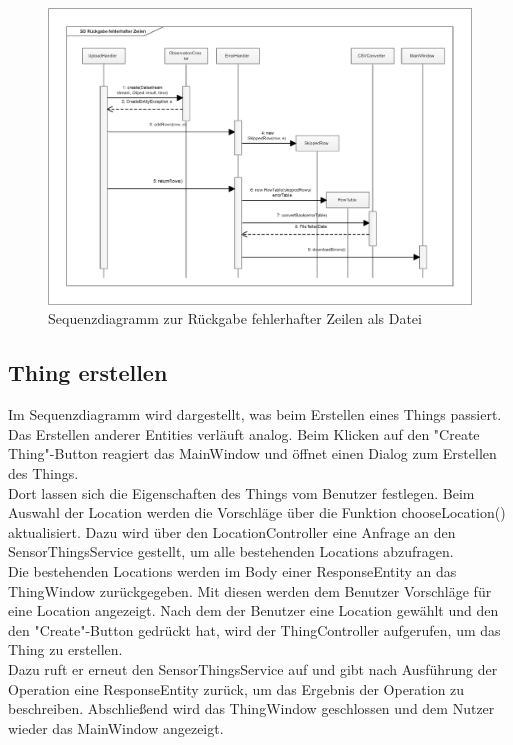 \vspace{\fill}
\begin{figure}[htbp]
\centering
\includegraphics[scale=0.5]{uml/eps/SD_returnErrors.eps}
\caption{Sequenzdiagramm zur Rückgabe fehlerhafter Zeilen als Datei}
\end{figure}
\vspace{\fill}

\clearpage
\subsection{Thing erstellen}

Im Sequenzdiagramm wird dargestellt, was beim Erstellen eines Things passiert.
Das Erstellen anderer Entities verläuft analog.
Beim Klicken auf den "{Create Thing}"{-Button} reagiert das MainWindow und öffnet einen Dialog zum Erstellen des Things.\\
Dort lassen sich die Eigenschaften des Things vom Benutzer festlegen.
Beim Auswahl der Location werden die Vorschläge über die Funktion chooseLocation() aktualisiert.
Dazu wird über den LocationController eine Anfrage an den SensorThingsService gestellt, um alle bestehenden Locations abzufragen.\\
Die bestehenden Locations werden im Body einer ResponseEntity an das ThingWindow zurückgegeben.
Mit diesen werden dem Benutzer Vorschläge für eine Location angezeigt.
Nach dem der Benutzer eine Location gewählt und den den "{Create}"{-Button} gedrückt hat, wird der ThingController aufgerufen, um das Thing zu erstellen.
\\Dazu ruft er erneut den SensorThingsService auf und gibt nach Ausführung der Operation eine ResponseEntity zurück, um das Ergebnis der Operation zu beschreiben.
Abschließend wird das ThingWindow geschlossen und dem Nutzer wieder das MainWindow angezeigt.

